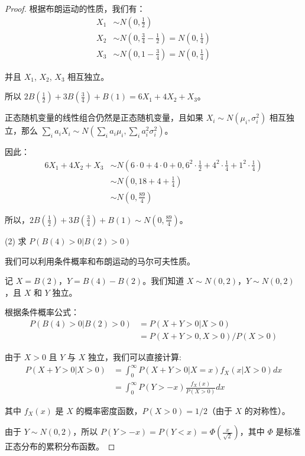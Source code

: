 \documentclass[lang=cn,10pt,thmcnt=section]{elegantbook}
\begin{document}
\begin{proof}
根据布朗运动的性质，我们有：
\begin{align}
X_1 &\sim N\left(0, \frac{1}{2}\right) \\
X_2 &\sim N\left(0, \frac{3}{4} - \frac{1}{2}\right) = N\left(0, \frac{1}{4}\right) \\
X_3 &\sim N\left(0, 1 - \frac{3}{4}\right) = N\left(0, \frac{1}{4}\right)
\end{align}

并且 $X_1$, $X_2$, $X_3$ 相互独立。

所以 $2B(\frac{1}{2}) + 3B(\frac{3}{4}) + B(1) = 6X_1 + 4X_2 + X_3$。

正态随机变量的线性组合仍然是正态随机变量，且如果 $X_i \sim N(\mu_i, \sigma_i^2)$ 相互独立，那么 $\sum_{i} a_i X_i \sim N(\sum_{i} a_i \mu_i, \sum_{i} a_i^2 \sigma_i^2)$。

因此：
\begin{align}
6X_1 + 4X_2 + X_3 &\sim N\left(6 \cdot 0 + 4 \cdot 0 + 0, 6^2 \cdot \frac{1}{2} + 4^2 \cdot \frac{1}{4} + 1^2 \cdot \frac{1}{4}\right) \\
&\sim N\left(0, 18 + 4 + \frac{1}{4}\right) \\
&\sim N\left(0, \frac{89}{4}\right)
\end{align}

所以，$2B(\frac{1}{2}) + 3B(\frac{3}{4}) + B(1) \sim N\left(0, \frac{89}{4}\right)$。

(2) 求 $P(B(4) > 0 | B(2) > 0)$

我们可以利用条件概率和布朗运动的马尔可夫性质。

记 $X = B(2)$，$Y = B(4) - B(2)$。我们知道 $X \sim N(0, 2)$，$Y \sim N(0, 2)$，且 $X$ 和 $Y$ 独立。

根据条件概率公式：
\begin{align}
P(B(4) > 0 | B(2) > 0) &= P(X + Y > 0 | X > 0) \\
&= P(X + Y > 0, X > 0) / P(X > 0)
\end{align}

由于 $X > 0$ 且 $Y$ 与 $X$ 独立，我们可以直接计算:
\begin{align}
P(X + Y > 0 | X > 0) &= \int_{0}^{\infty} P(X + Y > 0 | X = x) f_X(x | X > 0) dx \\
&= \int_{0}^{\infty} P(Y > -x) \frac{f_X(x)}{P(X > 0)} dx
\end{align}

其中 $f_X(x)$ 是 $X$ 的概率密度函数，$P(X > 0) = 1/2$（由于 $X$ 的对称性）。

由于 $Y \sim N(0, 2)$，所以 $P(Y > -x) = P(Y < x) = \Phi\left(\frac{x}{\sqrt{2}}\right)$，其中 $\Phi$ 是标准正态分布的累积分布函数。


\end{proof}
\end{document}
